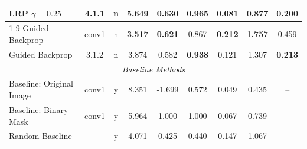 \begin{longtable}{p{4cm}|cc|cccccc}
    LRP $\gamma=0.25$ & 4.1.1 & n & 5.649 & 0.630 & \textbf{0.965} & 0.081 & 0.877 & \textbf{0.200} \\
    \cmidrule(lr){1-9}
    Guided Backprop & conv1 & n & \textbf{3.517} & \textbf{0.621} & 0.867 & \textbf{0.212} & \fboxsep=0.5pt\colorbox{red!20}{\textbf{1.757}} & 0.459 \\
    Guided Backprop & 3.1.2 & n & 3.874 & 0.582 & \textbf{0.938} & 0.121 & 1.307 & \textbf{0.213} \\
    \midrule
    \multicolumn{9}{c}{\textit{Baseline Methods}} \\
    \midrule
    Baseline: Original Image & conv1 & y & 8.351 & -1.699 & 0.572 & 0.049 & 0.435 & -- \\
    Baseline: Binary Mask & conv1 & y & 5.964 & 1.000 & 1.000 & 0.067 & 0.739 & -- \\
    Random Baseline & - & y & 4.071 & 0.425 & 0.440 & 0.147 & 1.067 & -- \\
    \midrule
    \end{longtable}